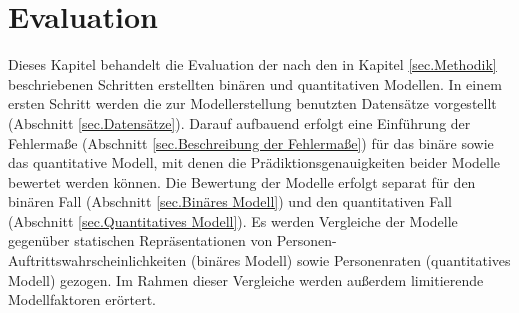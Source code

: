 \chapter{Evaluation}
\label{sec.Evaluation}
Dieses Kapitel behandelt die Evaluation der nach den in Kapitel \ref{sec.Methodik} beschriebenen Schritten erstellten binären und quantitativen Modellen. In einem ersten Schritt werden die zur Modellerstellung benutzten Datensätze vorgestellt (Abschnitt \ref{sec.Datensätze}). Darauf aufbauend erfolgt eine Einführung der Fehlermaße (Abschnitt \ref{sec.Beschreibung der Fehlermaße}) für das binäre sowie das quantitative Modell, mit denen die Prädiktionsgenauigkeiten beider Modelle bewertet werden können. Die Bewertung der Modelle erfolgt separat für den binären Fall (Abschnitt \ref{sec.Binäres Modell}) und den quantitativen Fall (Abschnitt \ref{sec.Quantitatives Modell}). Es werden Vergleiche der Modelle gegenüber statischen Repräsentationen von Personen-Auftrittswahrscheinlichkeiten (binäres Modell) sowie Personenraten (quantitatives Modell) gezogen. Im Rahmen dieser Vergleiche werden außerdem limitierende Modellfaktoren erörtert. \\
